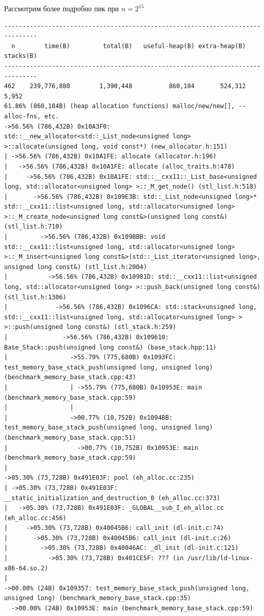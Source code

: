 Рассмотрим более подробно пик при \(n = 2^{15}\)
\begin{lstlisting}[caption={}, label={}, style=style_code_block]
-------------------------------------------------------------------------------
  n        time(B)         total(B)   useful-heap(B) extra-heap(B)   stacks(B)
-------------------------------------------------------------------------------
462    239,776,880        1,390,448          860,184       524,312        5,952
61.86% (860,184B) (heap allocation functions) malloc/new/new[], --alloc-fns, etc.
->56.56% (786,432B) 0x10A3F0: std::__new_allocator<std::_List_node<unsigned long> >::allocate(unsigned long, void const*) (new_allocator.h:151)
| ->56.56% (786,432B) 0x10A1FE: allocate (allocator.h:196)
|   ->56.56% (786,432B) 0x10A1FE: allocate (alloc_traits.h:478)
|     ->56.56% (786,432B) 0x10A1FE: std::__cxx11::_List_base<unsigned long, std::allocator<unsigned long> >::_M_get_node() (stl_list.h:518)
|       ->56.56% (786,432B) 0x109E3B: std::_List_node<unsigned long>* std::__cxx11::list<unsigned long, std::allocator<unsigned long> >::_M_create_node<unsigned long const&>(unsigned long const&) (stl_list.h:710)
|         ->56.56% (786,432B) 0x109BBB: void std::__cxx11::list<unsigned long, std::allocator<unsigned long> >::_M_insert<unsigned long const&>(std::_List_iterator<unsigned long>, unsigned long const&) (stl_list.h:2004)
|           ->56.56% (786,432B) 0x10981D: std::__cxx11::list<unsigned long, std::allocator<unsigned long> >::push_back(unsigned long const&) (stl_list.h:1306)
|             ->56.56% (786,432B) 0x1096CA: std::stack<unsigned long, std::__cxx11::list<unsigned long, std::allocator<unsigned long> > >::push(unsigned long const&) (stl_stack.h:259)
|               ->56.56% (786,432B) 0x109610: Base_Stack::push(unsigned long const&) (base_stack.hpp:11)
|                 ->55.79% (775,680B) 0x1093FC: test_memory_base_stack_push(unsigned long, unsigned long) (benchmark_memory_base_stack.cpp:43)
|                 | ->55.79% (775,680B) 0x10953E: main (benchmark_memory_base_stack.cpp:59)
|                 |   
|                 ->00.77% (10,752B) 0x1094BB: test_memory_base_stack_push(unsigned long, unsigned long) (benchmark_memory_base_stack.cpp:51)
|                   ->00.77% (10,752B) 0x10953E: main (benchmark_memory_base_stack.cpp:59)
|                     
->05.30% (73,728B) 0x491E03F: pool (eh_alloc.cc:235)
| ->05.30% (73,728B) 0x491E03F: __static_initialization_and_destruction_0 (eh_alloc.cc:373)
|   ->05.30% (73,728B) 0x491E03F: _GLOBAL__sub_I_eh_alloc.cc (eh_alloc.cc:456)
|     ->05.30% (73,728B) 0x40045B6: call_init (dl-init.c:74)
|       ->05.30% (73,728B) 0x40045B6: call_init (dl-init.c:26)
|         ->05.30% (73,728B) 0x40046AC: _dl_init (dl-init.c:121)
|           ->05.30% (73,728B) 0x401CE5F: ??? (in /usr/lib/ld-linux-x86-64.so.2)
|             
->00.00% (24B) 0x109357: test_memory_base_stack_push(unsigned long, unsigned long) (benchmark_memory_base_stack.cpp:35)
  ->00.00% (24B) 0x10953E: main (benchmark_memory_base_stack.cpp:59)
\end{lstlisting}

